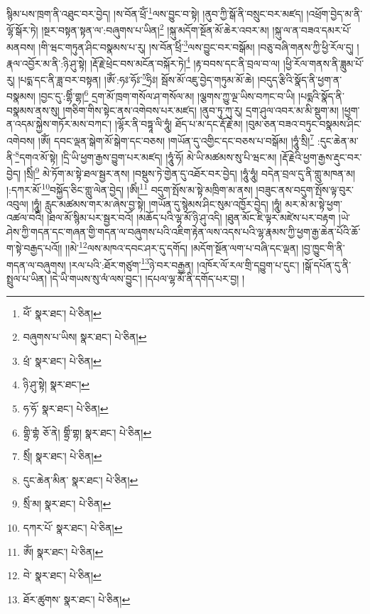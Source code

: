 སྙིམ་པས་ཁྲག་ནི་འཐུང་བར་བྱེད། །ས་བོན་ཕྲོཾ་\footnote{ཕོཾ་  སྣར་ཐང་།  པེ་ཅིན། }ལས་བྱུང་བ་སྟེ། །ནུབ་ཀྱི་སྒོ་ནི་བསྲུང་བར་མཛད། །འཕྲོག་བྱེད་མ་ནི་ལྷོ་སྒོར་ཏེ། །སྔར་བསྟན་སྟན་ལ་:བཞུགས་པ་ཡིན།\footnote{བཞུགས་པ་ཡིས།  སྣར་ཐང་།  པེ་ཅིན། } །སྐུ་མདོག་སྔོན་མོ་ཆེར་འབར་མ། །སྐུ་ལ་ན་བཟའ་དམར་པོ་མནབས། །གི་ཝང་གཏུན་ཤིང་བསྣམས་པ་རུ། །ས་བོན་ཕྲིཾ་\footnote{ཕྲཾ་  སྣར་ཐང་།  པེ་ཅིན། }ལས་བྱུང་བར་བསྒོམ། །བཅུ་བཞི་གནས་ཀྱི་ཕྱི་རོལ་དུ། །རྣལ་འབྱོར་མ་ནི་:ཉི་ཤུ་སྟེ། །རྡོ་རྗེ་ཕྲེང་བས་མངོན་བསྐོར་ཏེ།\footnote{ཉི་ཤུ་སྟེ།  སྣར་ཐང་། } །རྟ་བབས་དང་ནི་བྲལ་བ་ལ། །ཕྱི་རོལ་གནས་ནི་ཟླུམ་པོ་རུ། །པདྨ་དང་ནི་ཟླ་བར་བསྟན། །ཨོཾ་:ཧཿ་ཧོཿ་\footnote{ཧ་ཧོ་  སྣར་ཐང་།  པེ་ཅིན། }ཧྲིཿ། སྦོས་མོ་འཇུ་བྱེད་གཏུམ་མོ་ཆེ། །བདུད་རྩིའི་སྣོད་ནི་ཕྱག་ན་བསྣམས། །བྱང་དུ་:གྷིཾ་གྷ།\footnote{གྷྲི་གྷཾ  ཅོ་ནེ། གྷྲིཾ་གྷ།  སྣར་ཐང་།  པེ་ཅིན། } དྲག་མོ་ཁྲག་གསོལ་ཤ་གསོལ་མ། །ལྕགས་ཀྱུ་ལྔ་ཡིས་བཀང་བ་ཡི། །པདྨའི་སྣོད་ནི་བསྣམས་ནས་སུ། །གཅིག་གིས་སྟེང་ནས་འགེབས་པར་མཛད། །ནུབ་ཏུ་ཀུ་རུ། དྲག་ཤུལ་འབར་མ་མི་སྡུག་མ། །ཕྱག་ན་འདམ་སྐྱེས་གཏོར་མས་བཀང་། །ལྷོར་ནི་བཏྟཱ་ལི་ཧཱུཾ། ཐོད་པ་མ་དང་རྡོ་རྗེ་མ། །བུམ་ཅན་བཟའ་བཏུང་བསྣམས་ཤིང་འགེབས། །ཨོཾ། དབང་ལྡན་སྒེག་མོ་སྒེག་དང་བཅས། །གཡོན་དུ་འགྱིང་དང་བཅས་པ་བསྒོམ། །ཧཱུཾ་སྲི།\footnote{སྲིཾ།  སྣར་ཐང་།  པེ་ཅིན། } :དུང་ཆེན་མ་ནི་\footnote{དུང་ཆེན་མིན་  སྣར་ཐང་།  པེ་ཅིན། }དགའ་མོ་སྟེ། །དྲི་ཡི་ཕྱག་རྒྱས་བྱུག་པར་མཛད། །ཧཱུཾ་ཧོ། མེ་ཡི་མཚམས་སུ་པི་ཝང་མ། །རྡོ་རྗེའི་ཕྱག་རྒྱས་རྡུང་བར་བྱེད། །སྲིཾ།\footnote{སྲིཾ་མ།  སྣར་ཐང་།  པེ་ཅིན། } མེ་ཏོག་མ་སྟེ་ཐལ་སྦྱར་ནས། །བསྡུས་ཏེ་གྱེན་དུ་འཐོར་བར་བྱེད། །ཧཱུཾ་ཧཱུཾ། བདེན་བྲལ་དུ་ནི་གླུ་མཁན་མ། །:དཀར་མོ་\footnote{དཀར་པོ་  སྣར་ཐང་།  པེ་ཅིན། }བསྐྱོད་ཅིང་གླུ་ལེན་བྱེད། །ཨིཾ།\footnote{ཨོཾ།  སྣར་ཐང་།  པེ་ཅིན། } བདུག་སྤོས་མ་སྟེ་མཁྲིག་མ་ནས། །བཟུང་ནས་བདུག་སྤོས་ལྟ་བུར་འབུལ། །ཧཱུཾ། རླུང་མཚམས་གར་མ་ཞེས་བྱ་སྟེ། །གཡོན་དུ་སྙེམས་ཤིང་སུམ་འཁྱོར་བྱེད། །ཧཱུཾ། མར་མེ་མ་སྟེ་ཕྱག་འཚལ་བའི། །ཐལ་མོ་སྙིམ་པར་སྦྱར་བའོ། །མཆོད་པའི་ལྷ་མོ་ཉི་ཤུ་འདི། །ཐུན་མོང་ཇི་ལྟར་མཛེས་པར་བརྟག །ཡེ་ཤེས་ཀྱི་གདན་དང་གཞན་གྱི་གདན་ལ་བཞུགས་པའི་འཇིག་རྟེན་ལས་འདས་པའི་ལྷ་རྣམས་ཀྱི་ཕྱག་རྒྱ་ཆེན་པོའི་ཆོ་ག་སྟེ་བརྒྱད་པའོ།། །།མེ་\footnote{བེ་  སྣར་ཐང་།  པེ་ཅིན། }ལས་མཁའ་དབང་ཤར་དུ་དགོད། །མདོག་སྔོན་ལག་པ་བཞི་དང་ལྡན། །བྱ་ཁྱུང་གི་ནི་གདན་ལ་བཞུགས། །རལ་པའི་:ཐོར་གཙུག་\footnote{ཐོར་ཚུགས་  སྣར་ཐང་།  པེ་ཅིན། }ཉེ་བར་བརྒྱན། །འཁོར་ལོ་རལ་གྲི་དབྱུག་པ་དུང་། །སྒོ་དཔོན་དུ་ནི་སྤྲུལ་པ་ཡིན། །དེ་ཡི་གཡས་སུ་ལཾ་ལས་བྱུང་། །དཔལ་ལྷ་མོ་ནི་དགོད་པར་བྱ། །
